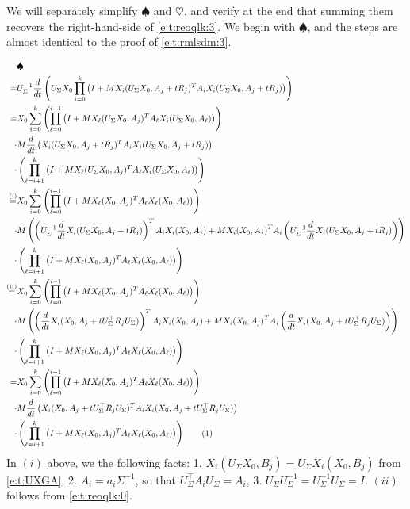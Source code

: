 \documentclass{article}
\newcommand*\lrp[1]{\left( #1 \right)}
\newcommand\numberthis{\addtocounter{equation}{1}\tag{\theequation}}
\newcommand{\US}{U_\Sigma}
\begin{document}
We will separately simplify $\spadesuit$ and $\heartsuit$, and verify at the end that summing them recovers the right-hand-side of \eqref{e:t:reoqlk:3}. We begin with $\spadesuit$, and the steps are almost identical to the proof of \eqref{e:t:rmlsdm:3}.

{\allowdisplaybreaks
\begin{align*}
& \spadesuit\\
=& \US^{-1} \frac{d}{dt} \lrp{\US X_0 \prod_{i=0}^{k} \lrp{I + M X_i(\US X_0,A_j+tR_j)^T A_i X_i(\US X_0,A_j+tR_j)}}\\
= & X_0 \sum_{i=0}^k \lrp{\prod_{\ell=0}^{i-1} \lrp{I + M X_\ell(\US X_0,A_j)^T A_\ell X_i(\US X_0,A_\ell)}}\\
\cdot& M \frac{d}{dt} \lrp{X_i(\US X_0,A_j+tR_j)^T A_i X_i(\US X_0,A_j + tR_j)} \\
\cdot& \lrp{\prod_{\ell=i+1}^{k} \lrp{I + M X_\ell(\US X_0,A_j)^T A_\ell X_i(\US X_0,A_\ell)}}\\
\overset{(i)}{=}& X_0 \sum_{i=0}^k \lrp{\prod_{\ell=0}^{i-1} \lrp{I + M X_\ell(X_0,A_j)^T A_\ell X_\ell(X_0,A_\ell)}}\\
\cdot& M \lrp{\lrp{\US^{-1} \frac{d}{dt}X_i(\US X_0,A_j+tR_j)}^T A_i X_i(X_0,A_j) + M {X_i(X_0,A_j)}^T A_i \lrp{\US^{-1} \frac{d}{dt}X_i(\US X_0,A_j+tR_j)}}\\
\cdot& \lrp{\prod_{\ell=i+1}^{k} \lrp{I + M X_\ell( X_0,A_j)^T A_\ell X_\ell( X_0,A_\ell)}}\\
\overset{(ii)}{=}& X_0 \sum_{i=0}^k \lrp{\prod_{\ell=0}^{i-1} \lrp{I + M X_\ell(X_0,A_j)^T A_\ell X_\ell(X_0,A_\ell)}}\\
\cdot& M \lrp{\lrp{\frac{d}{dt}X_i( X_0,A_j+t \US^{\top} R_j \US)}^T A_i X_i(X_0,A_j) + M {X_i(X_0,A_j)}^T A_i \lrp{\frac{d}{dt}X_i( X_0,A_j+t\US^{\top} R_j \US)}}\\
\cdot& \lrp{\prod_{\ell=i+1}^{k} \lrp{I + M X_\ell( X_0,A_j)^T A_\ell X_\ell( X_0,A_\ell)}}\\
=& X_0 \sum_{i=0}^k \lrp{\prod_{\ell=0}^{i-1} \lrp{I + M X_\ell(X_0,A_j)^T A_\ell X_\ell(X_0,A_\ell)}}\\
\cdot& M \frac{d}{dt} \lrp{X_i(X_0,A_j+t\US^{\top}R_j\US )^T A_i X_i(X_0,A_j + t \US^\top R_j \US)}\\
\cdot& \lrp{\prod_{\ell=i+1}^{k} \lrp{I + M X_\ell( X_0,A_j)^T A_\ell X_\ell( X_0,A_\ell)}}
\numberthis \label{e:t:spadesuit_end}
\end{align*}
}
In $(i)$ above, we  the following facts: 1. $X_i(\US X_0, B_j) = \US X_i(X_0, B_j)$ from \eqref{e:t:UXGA}, 2. $A_i = a_i \Sigma^{-1}$, so that $\US^{\top} A_i \US = A_i$, 3. $\US\US^{-1} = \US^{-1} \US = I$. $(ii)$ follows from \eqref{e:t:reoqlk:0}. 
\end{document}
